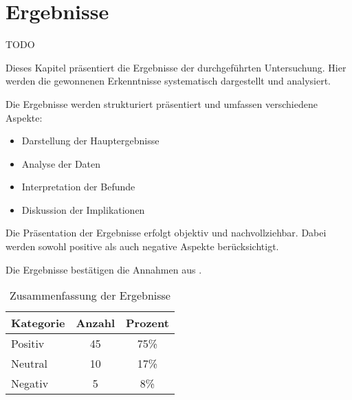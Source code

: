 
\chapter{Ergebnisse}\label{cha:results}

TODO

Dieses Kapitel präsentiert die Ergebnisse der durchgeführten Untersuchung. Hier werden die gewonnenen Erkenntnisse systematisch dargestellt und analysiert.

Die Ergebnisse werden strukturiert präsentiert und umfassen verschiedene Aspekte:

\begin{itemize}[leftmargin=0.63cm, label=\textbullet]
    \item Darstellung der Hauptergebnisse
    \item Analyse der Daten
    \item Interpretation der Befunde
    \item Diskussion der Implikationen
\end{itemize}

Die Präsentation der Ergebnisse erfolgt objektiv und nachvollziehbar. Dabei werden sowohl positive als auch negative Aspekte berücksichtigt.

Die Ergebnisse bestätigen die Annahmen aus \cite{beispiel2024}.

\begin{table}[htbp]
\centering
\caption{Zusammenfassung der Ergebnisse}
\label{tab:ergebnisse}
\begin{tabular}{lcc}
\toprule
Kategorie & Anzahl & Prozent \\
\midrule
Positiv & 45 & 75\% \\
Neutral & 10 & 17\% \\
Negativ & 5 & 8\% \\
\bottomrule
\end{tabular}
\end{table}

